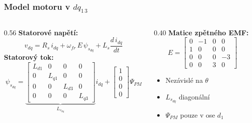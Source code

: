 \documentclass[%
  12pt,       				%
	t,                  %
	aspectratio=1610,   %
	unicode,						%
]{beamer}				    	%
\begin{document}
\begin{frame}
	\frametitle{Model motoru v $dq_{1\,3}$}

	\begin{columns}[T]
		\begin{column}{0.56\textwidth}
			\textbf{Statorové napětí:}
			\begin{equation*}
				v_{dq} = R_s\,i_{dq}
					+ \omega_{fr}\,E\, \psi_{s_{dq}}+ L_s\frac{d\,i_{dq}}{dt}
			\end{equation*}
			\vspace{0.5ex}
			\textbf{Statorový tok:}
			\begin{equation*}
				\psi_{s_{dq}} =
				\underbrace{
				\begin{bmatrix}
					L_{d1}&0&0&0\\
					0&L_{q1}&0&0\\
					0&0&L_{d3}&0\\
					0&0&0&L_{q3}
				\end{bmatrix}}_{L_{s_{dq}}}
				i_{dq}
				+
				\begin{bmatrix}1\\0\\0\\0\end{bmatrix}\Psi_{PM}
			\end{equation*}
		\end{column}
		\begin{column}{0.40\textwidth}
			\textbf{Matice zpětného EMF:}
			\begin{equation*}
				E =
				\begin{bmatrix}
					0&-1&0&0\\
					1&0&0&0\\
					0&0&0&-3\\
					0&0&3&0
				\end{bmatrix}
			\end{equation*}
			\vspace{0.5ex}
			\begin{alertblock}{}
				\begin{itemize}
					\item Nezávislé na $\theta$
					\item $L_{s_{dq}}$ diagonální 
					\item $\Psi_{PM}$ pouze v ose $d_1$
				\end{itemize}
			\end{alertblock}
		\end{column}
	\end{columns}
\end{frame}
\end{document}
